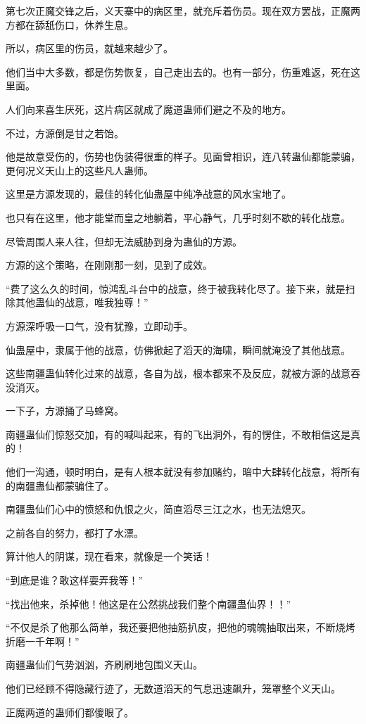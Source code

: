 \begin{this_body}
第七次正魔交锋之后，义天寨中的病区里，就充斥着伤员。现在双方罢战，正魔两方都在舔舐伤口，休养生息。

所以，病区里的伤员，就越来越少了。

他们当中大多数，都是伤势恢复，自己走出去的。也有一部分，伤重难返，死在这里面。

人们向来喜生厌死，这片病区就成了魔道蛊师们避之不及的地方。

不过，方源倒是甘之若饴。

他是故意受伤的，伤势也伪装得很重的样子。见面曾相识，连八转蛊仙都能蒙骗，更何况义天山上的这些凡人蛊师。

这里是方源发现的，最佳的转化仙蛊屋中纯净战意的风水宝地了。

也只有在这里，他才能堂而皇之地躺着，平心静气，几乎时刻不歇的转化战意。

尽管周围人来人往，但却无法威胁到身为蛊仙的方源。

方源的这个策略，在刚刚那一刻，见到了成效。

“费了这么久的时间，惊鸿乱斗台中的战意，终于被我转化尽了。接下来，就是扫除其他蛊仙的战意，唯我独尊！”

方源深呼吸一口气，没有犹豫，立即动手。

仙蛊屋中，隶属于他的战意，仿佛掀起了滔天的海啸，瞬间就淹没了其他战意。

这些南疆蛊仙转化过来的战意，各自为战，根本都来不及反应，就被方源的战意吞没消灭。

一下子，方源捅了马蜂窝。

南疆蛊仙们惊怒交加，有的喊叫起来，有的飞出洞外，有的愣住，不敢相信这是真的！

他们一沟通，顿时明白，是有人根本就没有参加赌约，暗中大肆转化战意，将所有的南疆蛊仙都蒙骗住了。

南疆蛊仙们心中的愤怒和仇恨之火，简直滔尽三江之水，也无法熄灭。

之前各自的努力，都打了水漂。

算计他人的阴谋，现在看来，就像是一个笑话！

“到底是谁？敢这样耍弄我等！”

“找出他来，杀掉他！他这是在公然挑战我们整个南疆蛊仙界！！”

“不仅是杀了他那么简单，我还要把他抽筋扒皮，把他的魂魄抽取出来，不断烧烤折磨一千年啊！”

南疆蛊仙们气势汹汹，齐刷刷地包围义天山。

他们已经顾不得隐藏行迹了，无数道滔天的气息迅速飙升，笼罩整个义天山。

正魔两道的蛊师们都傻眼了。


\end{this_body}

